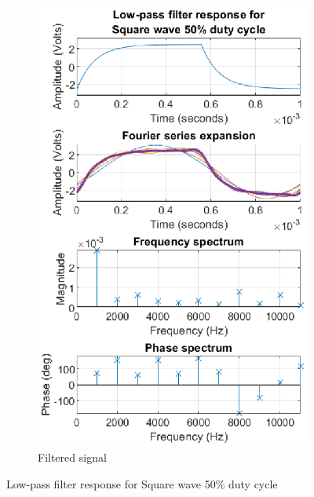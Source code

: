 \documentclass[notitlepage, a4paper, 11pt]{article}
\begin{document}
\begin{figure}[H]
\begin{subfigure}{0.45\textwidth}
			\includegraphics[width=\textwidth]{../Matlab/img/RCLPsqr50}
			\caption{Filtered signal}
		\end{subfigure}
		\caption{Low-pass filter response for Square wave 50\% duty cycle}
	\end{figure}
\end{document}
